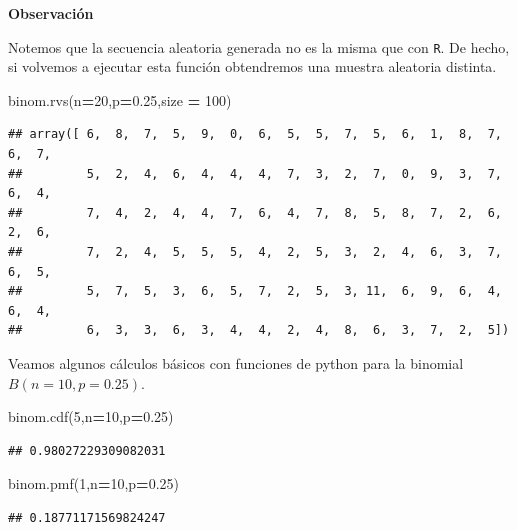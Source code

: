 \documentclass[]{book}
\newenvironment{Shaded}{\begin{snugshade}}{\end{snugshade}}
\newcommand{\DecValTok}[1]{\textcolor[rgb]{0.00,0.00,0.81}{#1}}
\newcommand{\FloatTok}[1]{\textcolor[rgb]{0.00,0.00,0.81}{#1}}
\newcommand{\NormalTok}[1]{#1}
\newcommand{\OperatorTok}[1]{\textcolor[rgb]{0.81,0.36,0.00}{\textbf{#1}}}
\begin{document}
 \textbf{Observación}

Notemos que la secuencia aleatoria generada no es la misma que con \texttt{R}. De hecho, si volvemos a ejecutar esta función obtendremos una muestra aleatoria distinta.

\begin{Shaded}
\begin{Highlighting}[]
\NormalTok{binom.rvs(n}\OperatorTok{=}\DecValTok{20}\NormalTok{,p}\OperatorTok{=}\FloatTok{0.25}\NormalTok{,size }\OperatorTok{=} \DecValTok{100}\NormalTok{)}
\end{Highlighting}
\end{Shaded}

\begin{verbatim}
## array([ 6,  8,  7,  5,  9,  0,  6,  5,  5,  7,  5,  6,  1,  8,  7,  6,  7,
##         5,  2,  4,  6,  4,  4,  4,  7,  3,  2,  7,  0,  9,  3,  7,  6,  4,
##         7,  4,  2,  4,  4,  7,  6,  4,  7,  8,  5,  8,  7,  2,  6,  2,  6,
##         7,  2,  4,  5,  5,  5,  4,  2,  5,  3,  2,  4,  6,  3,  7,  6,  5,
##         5,  7,  5,  3,  6,  5,  7,  2,  5,  3, 11,  6,  9,  6,  4,  6,  4,
##         6,  3,  3,  6,  3,  4,  4,  2,  4,  8,  6,  3,  7,  2,  5])
\end{verbatim}

Veamos algunos cálculos básicos con funciones de python para la binomial \(B(n=10,p=0.25)\).

\begin{Shaded}
\begin{Highlighting}[]
\NormalTok{binom.cdf(}\DecValTok{5}\NormalTok{,n}\OperatorTok{=}\DecValTok{10}\NormalTok{,p}\OperatorTok{=}\FloatTok{0.25}\NormalTok{)}
\end{Highlighting}
\end{Shaded}

\begin{verbatim}
## 0.98027229309082031
\end{verbatim}

\begin{Shaded}
\begin{Highlighting}[]
\NormalTok{binom.pmf(}\DecValTok{1}\NormalTok{,n}\OperatorTok{=}\DecValTok{10}\NormalTok{,p}\OperatorTok{=}\FloatTok{0.25}\NormalTok{)}
\end{Highlighting}
\end{Shaded}

\begin{verbatim}
## 0.18771171569824247
\end{verbatim}
\end{document}
